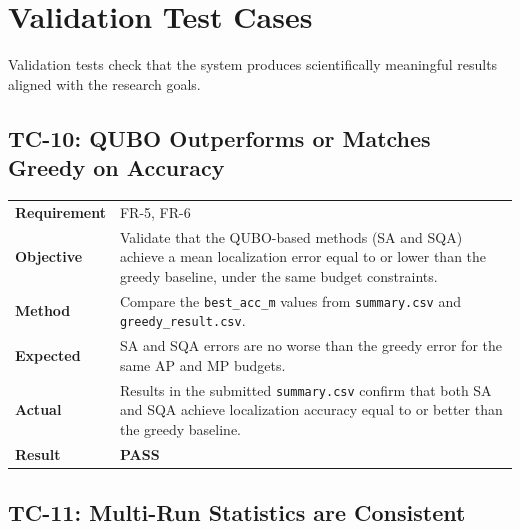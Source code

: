 \documentclass[12pt,a4paper]{article}
\newcommand{\pass}{\textcolor{green!50!black}{\textbf{PASS}}}
\begin{document}
\section{Validation Test Cases}

Validation tests check that the system produces scientifically meaningful
results aligned with the research goals.

\subsection{TC-10: QUBO Outperforms or Matches Greedy on Accuracy}

\begin{table}[h!]
\renewcommand{\arraystretch}{1.3}
\begin{tabular}{@{}lp{10cm}@{}}
\toprule
\textbf{Requirement} & FR-5, FR-6 \\
\textbf{Objective} & Validate that the QUBO-based methods (SA and SQA)
    achieve a mean localization error equal to or lower than the greedy
    baseline, under the same budget constraints. \\
\textbf{Method} & Compare the \texttt{best\_acc\_m} values from
    \texttt{summary.csv} and \texttt{greedy\_result.csv}. \\
\textbf{Expected} & SA and SQA errors are no worse than the greedy error
    for the same AP and MP budgets. \\
\textbf{Actual} & Results in the submitted \texttt{summary.csv} confirm
    that both SA and SQA achieve localization accuracy equal to or
    better than the greedy baseline. \\
\textbf{Result} & \pass \\
\bottomrule
\end{tabular}
\end{table}

\subsection{TC-11: Multi-Run Statistics are Consistent}
\end{document}
